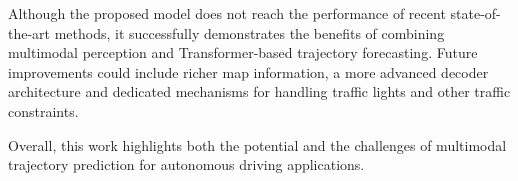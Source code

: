 \documentclass[conference]{IEEEtran}
\begin{document}
Although the proposed model does not reach the performance of recent state-of-the-art methods, it successfully demonstrates the benefits of combining multimodal perception and Transformer-based trajectory forecasting. Future improvements could include richer map information, a more advanced decoder architecture and dedicated mechanisms for handling traffic lights and other traffic constraints.

Overall, this work highlights both the potential and the challenges of multimodal trajectory prediction for autonomous driving applications.




\printbibliography
\end{document}
